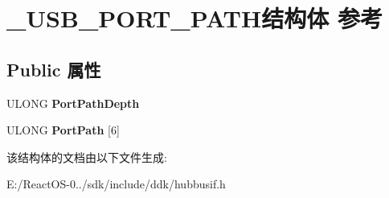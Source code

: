 \hypertarget{struct___u_s_b___p_o_r_t___p_a_t_h}{}\section{\+\_\+\+U\+S\+B\+\_\+\+P\+O\+R\+T\+\_\+\+P\+A\+T\+H结构体 参考}
\label{struct___u_s_b___p_o_r_t___p_a_t_h}
\subsection*{Public 属性}
\begin{DoxyCompactItemize}
\item 
\mbox{\label{struct___u_s_b___p_o_r_t___p_a_t_h_ab09b70bbfb6e039f3cf5db3f80179551}} 
U\+L\+O\+NG {\bfseries Port\+Path\+Depth}
\item 
\mbox{\label{struct___u_s_b___p_o_r_t___p_a_t_h_af1d52290565858a932f289aab8e73e6c}} 
U\+L\+O\+NG {\bfseries Port\+Path} \mbox{[}6\mbox{]}
\end{DoxyCompactItemize}


该结构体的文档由以下文件生成\+:\begin{DoxyCompactItemize}
\item 
E\+:/\+React\+O\+S-\/0../sdk/include/ddk/hubbusif.\+h\end{DoxyCompactItemize}
